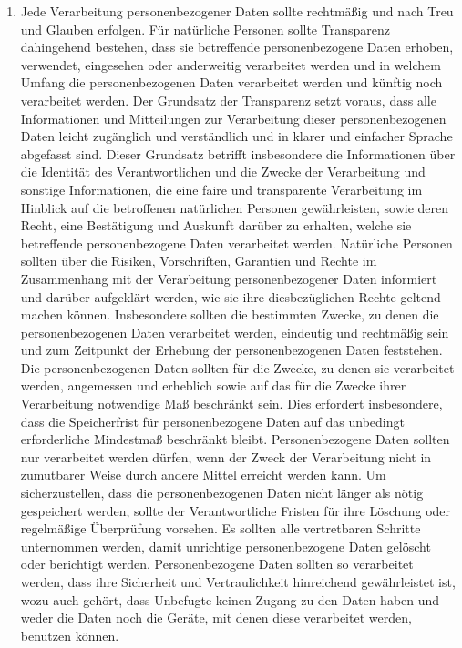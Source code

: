 \begin{enumerate}
   \item Jede Verarbeitung personenbezogener Daten sollte rechtmäßig und nach Treu und Glauben erfolgen. Für natürliche
    Personen sollte Transparenz dahingehend bestehen, dass sie betreffende personenbezogene Daten erhoben, verwendet,
    eingesehen oder anderweitig verarbeitet werden und in welchem Umfang die personenbezogenen Daten verarbeitet werden
    und künftig noch verarbeitet werden. Der Grundsatz der Transparenz setzt voraus, dass alle Informationen und
    Mitteilungen zur Verarbeitung dieser personenbezogenen Daten leicht zugänglich und verständlich und in klarer und
    einfacher Sprache abgefasst sind. Dieser Grundsatz betrifft insbesondere die Informationen über die Identität des
    Verantwortlichen und die Zwecke der Verarbeitung und sonstige Informationen, die eine faire und transparente
    Verarbeitung im Hinblick auf die betroffenen natürlichen Personen gewährleisten, sowie deren Recht, eine
    Bestätigung und Auskunft darüber zu erhalten, welche sie betreffende personenbezogene Daten verarbeitet werden.
    Natürliche Personen sollten über die Risiken, Vorschriften, Garantien und Rechte im Zusammenhang mit der
    Verarbeitung personenbezogener Daten informiert und darüber aufgeklärt werden, wie sie ihre diesbezüglichen Rechte
    geltend machen können. Insbesondere sollten die bestimmten Zwecke, zu denen die personenbezogenen Daten verarbeitet
    werden, eindeutig und rechtmäßig sein und zum Zeitpunkt der Erhebung der personenbezogenen Daten feststehen. Die
    personenbezogenen Daten sollten für die Zwecke, zu denen sie verarbeitet werden, angemessen und erheblich sowie auf
    das für die Zwecke ihrer Verarbeitung notwendige Maß beschränkt sein. Dies erfordert insbesondere, dass die
    Speicherfrist für personenbezogene Daten auf das unbedingt erforderliche Mindestmaß beschränkt bleibt.
    Personenbezogene Daten sollten nur verarbeitet werden dürfen, wenn der Zweck der Verarbeitung nicht in zumutbarer
    Weise durch andere Mittel erreicht werden kann. Um sicherzustellen, dass die personenbezogenen Daten nicht länger
    als nötig gespeichert werden, sollte der Verantwortliche Fristen für ihre Löschung oder regelmäßige Überprüfung
    vorsehen. Es sollten alle vertretbaren Schritte unternommen werden, damit unrichtige personenbezogene Daten
    gelöscht oder berichtigt werden. Personenbezogene Daten sollten so verarbeitet werden, dass ihre Sicherheit und
    Vertraulichkeit hinreichend gewährleistet ist, wozu auch gehört, dass Unbefugte keinen Zugang zu den Daten haben
    und weder die Daten noch die Geräte, mit denen diese verarbeitet werden, benutzen können.%
   \label{eg:39}
   

\end{enumerate}
